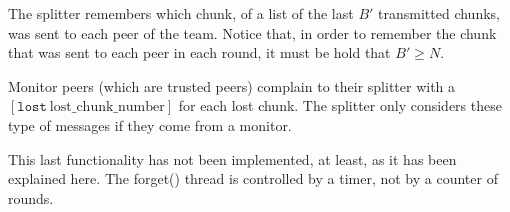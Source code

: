 

\label{sec:free_riding_control}

The splitter remembers which chunk, of a list of the last $B'$
transmitted chunks, was sent to each peer of the team. Notice that, in
order to remember the chunk that was sent to each peer in each round,
it must be hold that $B'\ge N$. 

Monitor peers (which are trusted peers) complain to their splitter
with a $[\mathtt{lost}~\text{lost\_chunk\_number}]$ for each lost
chunk. The splitter only considers these type of messages if they come
from a monitor.


\begin{notex}
This last functionality has not been implemented, at least, as it has
been explained here. The forget() thread is controlled by a timer, not
by a counter of rounds.
\end{notex}

